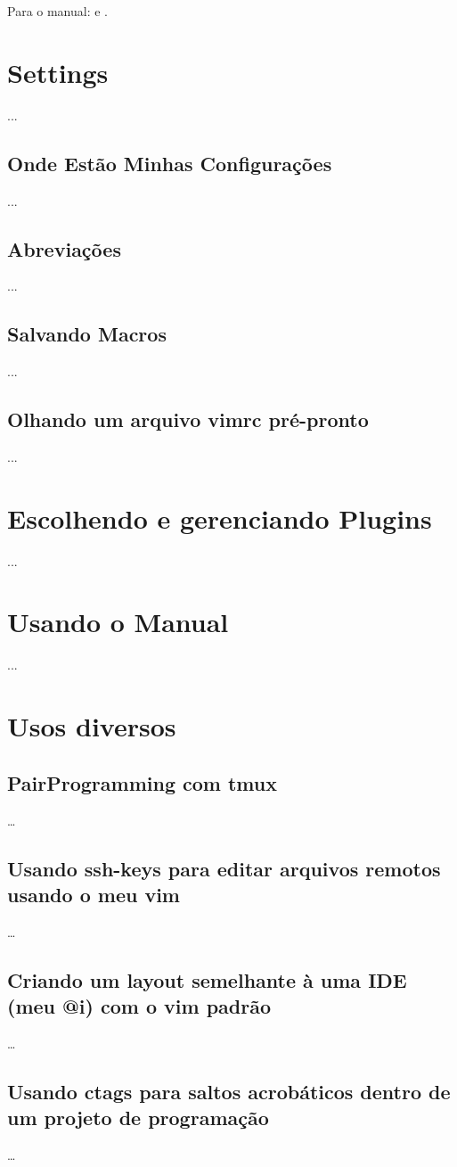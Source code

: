 \documentclass[a4paper, 12pt]{article}
\begin{document}
Para o manual:   e .

\newpage
\section{Settings}
...
\subsection{Onde Estão Minhas Configurações}
...
\subsection{Abreviações}
...
\subsection{Salvando Macros}
...
\subsection{Olhando um arquivo vimrc pré-pronto}
...
\newpage
\section{Escolhendo e gerenciando Plugins}
...

\newpage
\section{Usando o Manual}
...

\newpage
\section{Usos diversos}
\subsection{PairProgramming com tmux}
\ldots
\subsection{Usando ssh-keys para editar arquivos remotos usando o meu vim}
\ldots
\subsection{Criando um layout semelhante à uma IDE (meu @i) com o vim padrão}
\ldots
\subsection{Usando ctags para saltos acrobáticos dentro de um projeto de programação}
\ldots

\end{document}
